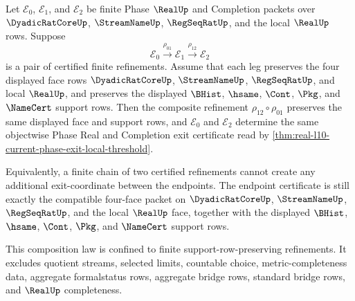 \begin{theorem}
\label{thm:real-l10-exit-certificate-refinement-composition}
Let $\mathcal E_0$, $\mathcal E_1$, and $\mathcal E_2$ be finite Phase $\RealUp$ and Completion packets over $\DyadicRatCoreUp$, $\StreamNameUp$, $\RegSeqRatUp$, and the local $\RealUp$ rows. Suppose
$$
\mathcal E_0 \xrightarrow{\rho_{01}} \mathcal E_1 \xrightarrow{\rho_{12}} \mathcal E_2
$$
is a pair of certified finite refinements. Assume that each leg preserves the four displayed face rows $\DyadicRatCoreUp$, $\StreamNameUp$, $\RegSeqRatUp$, and local $\RealUp$, and preserves the displayed $\BHist$, $\hsame$, $\Cont$, $\Pkg$, and $\NameCert$ support rows. Then the composite refinement $\rho_{12}\circ\rho_{01}$ preserves the same displayed face and support rows, and $\mathcal E_0$ and $\mathcal E_2$ determine the same objectwise Phase Real and Completion exit certificate read by \autoref{thm:real-l10-current-phase-exit-local-threshold}.

Equivalently, a finite chain of two certified refinements cannot create any additional exit-coordinate between the endpoints. The endpoint certificate is still exactly the compatible four-face packet on $\DyadicRatCoreUp$, $\StreamNameUp$, $\RegSeqRatUp$, and the local $\RealUp$ face, together with the displayed $\BHist$, $\hsame$, $\Cont$, $\Pkg$, and $\NameCert$ support rows.

This composition law is confined to finite support-row-preserving refinements. It excludes quotient streams, selected limits, countable choice, metric-completeness data, aggregate formalstatus rows, aggregate bridge rows, standard bridge rows, and $\RealUp$ completeness.
\end{theorem}
